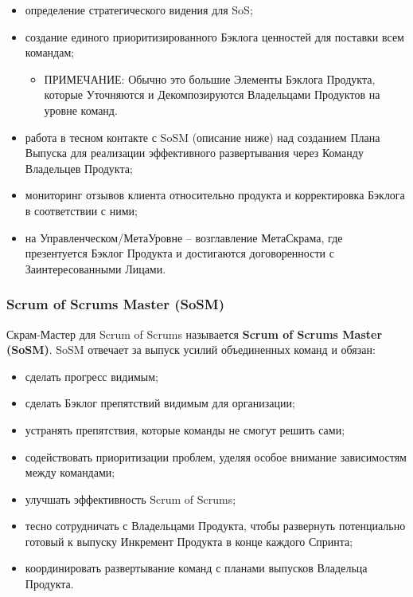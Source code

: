 \documentclass[12pt,a4paper,parskip=full]{scrartcl}
\begin{document}
\begin{itemize}
	\item определение стратегического видения для SoS; 
	\item создание единого приоритизированного  Бэклога ценностей для поставки всем командам;
	\begin{itemize}
		\item ПРИМЕЧАНИЕ: Обычно это большие Элементы Бэклога Продукта, которые Уточняются и Декомпозируются Владельцами Продуктов на уровне команд.
	\end{itemize}
	\item работа в тесном контакте с SoSM (описание ниже) над созданием Плана Выпуска для реализации эффективного развертывания через Команду Владельцев Продукта; 
	\item мониторинг отзывов клиента относительно продукта и корректировка Бэклога в соответствии с ними; 
	\item на Управленческом/МетаУровне – возглавление МетаСкрама, где презентуется Бэклог Продукта и достигаются договоренности с Заинтересованными Лицами. 
\end{itemize}



\subsubsection{Scrum of Scrums Master (SoSM)}

Скрам-Мастер для Scrum of Scrums называется \textbf{Scrum of Scrums Master (SoSM)}. SoSM отвечает за выпуск усилий объединенных команд и обязан: 

\begin{itemize}
	\item сделать прогресс видимым;
	\item сделать Бэклог препятствий видимым для организации; 
	\item устранять препятствия, которые команды не смогут решить сами; 
	\item содействовать приоритизации проблем, уделяя особое внимание зависимостям между командами; 
	\item улучшать эффективность Scrum of Scrums;
	\item тесно сотрудничать с Владельцами Продукта, чтобы развернуть потенциально готовый к выпуску Инкремент Продукта в конце каждого Спринта;
	\item координировать развертывание команд с планами выпусков Владельца Продукта. 
	
\end{itemize}
\end{document}
